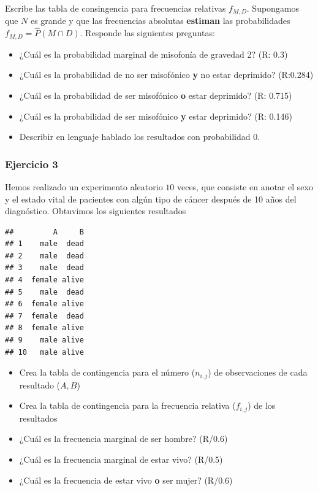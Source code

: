 \documentclass[
]{book}
\providecommand{\tightlist}{%
  \setlength{\itemsep}{0pt}\setlength{\parskip}{0pt}}
\begin{document}
Escribe las tabla de consingencia para frecuencias relativas \(f_{M,D}\). Supongamos que \(N\) es grande y que las frecuencias absolutas \textbf{estiman} las probabilidades \(f_{M,D}=\hat{P}(M \cap D)\). Responde las siguientes preguntas:

\begin{itemize}
\tightlist
\item
  ¿Cuál es la probabilidad marginal de misofonía de gravedad 2? (R: 0.3)
\item
  ¿Cuál es la probabilidad de no ser misofónico \textbf{y} no estar deprimido? (R:0.284)
\item
  ¿Cuál es la probabilidad de ser misofónico \textbf{o} estar deprimido? (R: 0.715)
\item
  ¿Cuál es la probabilidad de ser misofónico \textbf{y} estar deprimido? (R: 0.146)
\item
  Describir en lenguaje hablado los resultados con probabilidad 0.
\end{itemize}

\hypertarget{ejercicio-3}{%
\subsubsection{Ejercicio 3}\label{ejercicio-3}}

Hemos realizado un experimento aleatorio \(10\) veces, que consiste en anotar el sexo y el estado vital de pacientes con algún tipo de cáncer después de 10 años del diagnóstico. Obtuvimos los siguientes resultados

\begin{verbatim}
##         A     B
## 1    male  dead
## 2    male  dead
## 3    male  dead
## 4  female alive
## 5    male  dead
## 6  female alive
## 7  female  dead
## 8  female alive
## 9    male alive
## 10   male alive
\end{verbatim}

\begin{itemize}
\tightlist
\item
  Crea la tabla de contingencia para el número (\(n_{i,j}\)) de observaciones de cada resultado (\(A,B\))
\item
  Crea la tabla de contingencia para la frecuencia relativa (\(f_{i,j}\)) de los resultados
\item
  ¿Cuál es la frecuencia marginal de ser hombre? (R/0.6)
\item
  ¿Cuál es la frecuencia marginal de estar vivo? (R/0.5)
\item
  ¿Cuál es la frecuencia de estar vivo \textbf{o} ser mujer? (R/0.6)
\end{itemize}
\end{document}
